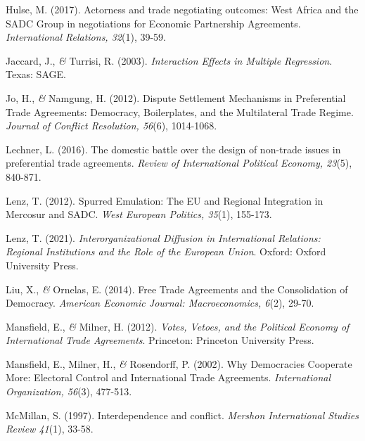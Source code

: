 \documentclass[a4paper]{tufte-handout}
\begin{document}
\begin{list}{}
\item{\small Hulse, M. (2017). Actorness and trade negotiating outcomes: West Africa and the SADC Group in negotiations for Economic Partnership Agreements. {\itshape International Relations, 32}(1), 39-59.}

\item{\small Jaccard, J., {\itshape \&} Turrisi, R. (2003). {\itshape Interaction Effects in Multiple Regression}. Texas: SAGE.}

\item{\small Jo, H., {\itshape \&} Namgung, H. (2012). Dispute Settlement Mechanisms in Preferential Trade Agreements: Democracy, Boilerplates, and the Multilateral Trade Regime. {\itshape Journal of Conflict Resolution, 56}(6), 1014-1068.}

\item{\small Lechner, L. (2016). The domestic battle over the design of non-trade issues in preferential trade agreements. {\itshape Review of International Political Economy, 23}(5), 840-871.}

\item{\small Lenz, T. (2012). Spurred Emulation: The EU and Regional Integration in Mercosur and SADC. {\itshape West European Politics, 35}(1), 155-173.}

\item{\small Lenz, T. (2021). {\itshape Interorganizational Diffusion in International Relations: Regional Institutions and the Role of the European Union}. Oxford: Oxford University Press.}

\item{\small Liu, X., {\itshape \&} Ornelas, E. (2014). Free Trade Agreements and the Consolidation of Democracy. {\itshape American Economic Journal: Macroeconomics, 6}(2), 29-70.}

\item{\small Mansfield, E., {\itshape \&} Milner, H. (2012). {\itshape Votes, Vetoes, and the Political Economy of International Trade Agreements}. Princeton: Princeton University Press.}

\item{\small Mansfield, E., Milner, H., {\itshape \&} Rosendorff, P. (2002). Why Democracies Cooperate More: Electoral Control and International Trade Agreements. {\itshape International Organization, 56}(3), 477-513.}

\item{\small McMillan, S. (1997). Interdependence and conflict. {\itshape Mershon International Studies Review 41}(1), 33-58.}


\end{list}
\end{document}
